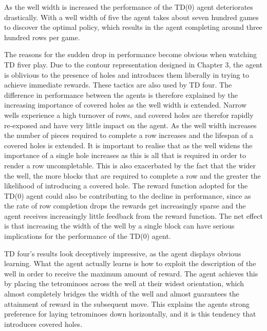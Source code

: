 \documentclass{rucsthesis}
\begin{document}
As the well width is increased the performance of the TD(0) agent deteriorates drastically. With a well width of five the agent takes about seven hundred games to discover the optimal policy, which results in the agent completing around three hundred rows per game.

The reasons for the sudden drop in performance become obvious when watching TD fiver play. Due to the contour representation designed in Chapter 3, the agent is oblivious to the presence of holes and introduces them liberally in trying to achieve immediate rewards. These tactics are also used by TD four. The difference in performance between the agents is therefore explained by the increasing importance of covered holes as the well width is extended. Narrow wells experience a high turnover of rows, and covered holes are therefor rapidly re-exposed and have very little impact on the agent. As the well width increases the number of pieces required to complete a row increases and the lifespan of a covered holes is extended. It is important to realise that as the well widens the importance of a single hole increases as this is all that is required in order to render a row uncompletable. This is also exacerbated by the fact that the wider the well, the more blocks that are required to complete a row and the greater the likelihood of introducing a covered hole. The reward function adopted for the TD(0) agent could also be contributing to the decline in performance, since as the rate of row completion drops the rewards get increasingly sparse and the agent receives increasingly little feedback from the reward function. The net effect is that increasing the width of the well by a single block can have serious implications for the performance of the TD(0) agent. 

TD four's results look deceptively impressive, as the agent displays obvious learning. What the agent actually learns is how to exploit the description of the well in order to receive the maximum amount of reward. The agent achieves this by placing the tetrominoes across the well at their widest orientation, which almost completely bridges the width of the well and almost guarantees the attainment of reward in the subsequent move. This explains the agents strong preference for laying tetrominoes down horizontally, and it is this tendency that introduces covered holes. 
\end{document}
